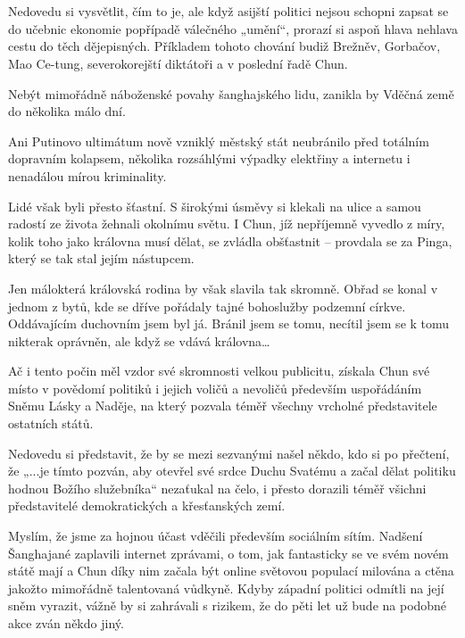 \chapter{}

Nedovedu si vysvětlit, čím to je, ale když asijští politici nejsou schopni zapsat se do učebnic ekonomie popřípadě válečného „umění“, prorazí si aspoň hlava nehlava cestu do těch dějepisných. Příkladem tohoto chování budiž Brežněv, Gorbačov, Mao Ce-tung, severokorejští diktátoři a v poslední řadě Chun.

Nebýt mimořádně náboženské povahy šanghajského lidu, zanikla by Vděčná země do několika málo dní.

Ani Putinovo ultimátum nově vzniklý městský stát neubránilo před totálním dopravním kolapsem, několika rozsáhlými výpadky elektřiny a internetu i nenadálou mírou kriminality.

Lidé však byli přesto šťastní. S širokými úsměvy si klekali na ulice a samou radostí ze života žehnali okolnímu světu. I Chun, jíž nepříjemně vyvedlo z míry, kolik toho jako královna musí dělat, se zvládla obšťastnit – provdala se za Pinga, který se tak stal jejím nástupcem.

Jen málokterá královská rodina by však slavila tak skromně. Obřad se konal v jednom z bytů, kde se dříve pořádaly tajné bohoslužby podzemní církve. Oddávajícím duchovním jsem byl já. Bránil jsem se tomu, necítil jsem se k tomu nikterak oprávněn, ale když se vdává královna…

Ač i tento počin měl vzdor své skromnosti velkou publicitu, získala Chun své místo v povědomí politiků i jejich voličů a nevoličů především uspořádáním Sněmu Lásky a Naděje, na který pozvala téměř všechny vrcholné představitele ostatních států.

Nedovedu si představit, že by se mezi sezvanými našel někdo, kdo si po přečtení, že „...je tímto pozván, aby otevřel své srdce Duchu Svatému a začal dělat politiku hodnou Božího služebníka“ nezaťukal na čelo, i přesto dorazili téměř všichni představitelé demokratických a křesťanských zemí. 

Myslím, že jsme za hojnou účast vděčili především sociálním sítím. Nadšení Šanghajané zaplavili internet zprávami, o tom, jak fantasticky se ve svém novém státě mají a Chun díky nim začala být online světovou populací milována a ctěna jakožto mimořádně talentovaná vůdkyně. Kdyby západní politici odmítli na její sněm vyrazit, vážně by si zahrávali s rizikem, že do pěti let už bude na podobné akce zván někdo jiný.  
	
